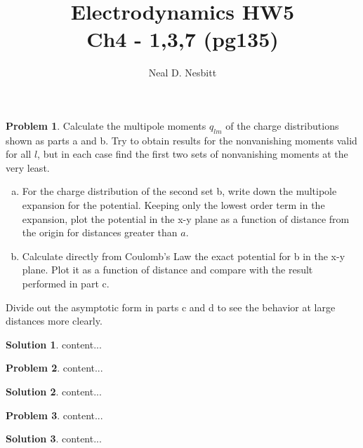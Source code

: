 \documentclass{article}
\title{Electrodynamics HW5\\
Ch4 - 1,3,7 (pg135)}
\author{Neal D. Nesbitt}
\begin{document}
\maketitle

\theoremstyle{definition}
\newtheorem{problem}{Problem}
\newtheorem{solution}{Solution}[problem]

\begin{problem}
Calculate the multipole moments $q_{lm}$ of the charge distributions shown as parts a and b. Try to obtain results for the nonvanishing moments valid for all $l$, but in each case find the first two sets of nonvanishing moments at the very least.
\begin{enumerate}[(a)]
\item For the charge distribution of the second set b, write down the multipole expansion for the potential. Keeping only the lowest order term in the expansion, plot the potential in the x-y plane as a function of distance from the origin for distances greater than $a$.
\item Calculate directly from Coulomb's Law the exact potential for b in the x-y plane. Plot it as a function of distance and compare with the result performed in part c.
\end{enumerate}
Divide out the asymptotic form in parts c and d to see the behavior at large distances more clearly.
\end{problem}

\begin{solution}
content...
\end{solution}

\setcounter{problem}{2}
\begin{problem}
content...
\end{problem}

\begin{solution}
content...
\end{solution}

\setcounter{problem}{6}
\begin{problem}
content...
\end{problem}

\begin{solution}
content...
\end{solution}
\end{document}

